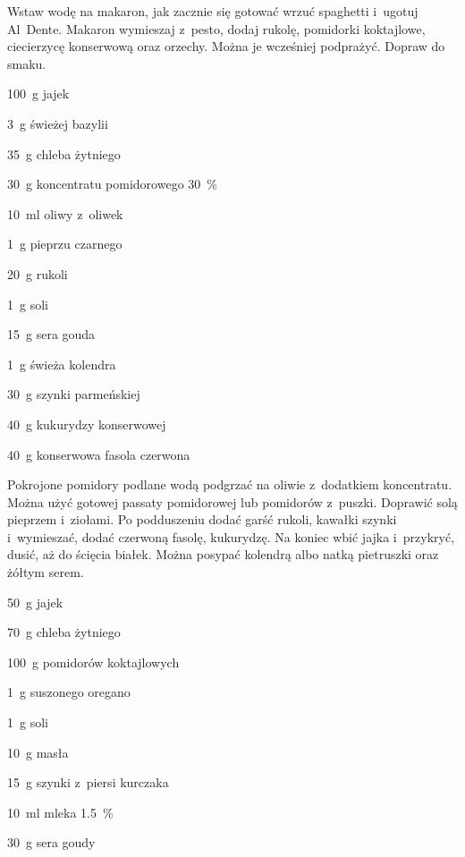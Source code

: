 \documentclass[../main.tex]{subfiles}
\begin{document}
Wstaw wodę na makaron, jak zacznie się gotować wrzuć spaghetti i~ugotuj
Al~Dente. Makaron wymieszaj z~pesto, dodaj rukolę, pomidorki koktajlowe,
ciecierzycę konserwową oraz orzechy. Można je wcześniej podprażyć. Dopraw do
smaku.


\begin{Ingred}
    \item \qty{100}{\gram} jajek
    \item \qty{3}{\gram} świeżej bazylii
    \item \qty{35}{\gram} chleba żytniego
    \item \qty{30}{\gram} koncentratu pomidorowego \qty{30}{\percent}
    \item \qty{10}{\milli\litre} oliwy z~oliwek
    \item \qty{1}{\gram} pieprzu czarnego
    \item \qty{20}{\gram} rukoli
    \item \qty{1}{\gram} soli
    \item \qty{15}{\gram} sera gouda
    \item \qty{1}{\gram} świeża kolendra
    \item \qty{30}{\gram} szynki parmeńskiej
    \item \qty{40}{\gram} kukurydzy konserwowej
    \item \qty{40}{\gram} konserwowa fasola czerwona
\end{Ingred}

Pokrojone pomidory podlane wodą podgrzać na oliwie z~dodatkiem koncentratu.
Można użyć gotowej passaty pomidorowej lub pomidorów z~puszki. Doprawić solą
pieprzem i~ziołami. Po podduszeniu dodać garść rukoli, kawałki szynki
i~wymieszać, dodać czerwoną fasolę, kukurydzę. Na koniec wbić jajka i~przykryć,
dusić, aż do ścięcia białek. Można posypać kolendrą albo natką pietruszki oraz
żółtym serem.


\begin{Ingred}
    \item \qty{50}{\gram} jajek
    \item \qty{70}{\gram} chleba żytniego
    \item \qty{100}{\gram} pomidorów koktajlowych
    \item \qty{1}{\gram} suszonego oregano
    \item \qty{1}{\gram} soli
    \item \qty{10}{\gram} masła
    \item \qty{15}{\gram} szynki z~piersi kurczaka
    \item \qty{10}{\milli\litre} mleka \qty{1.5}{\percent}
    \item \qty{30}{\gram} sera goudy
\end{Ingred}
\end{document}
